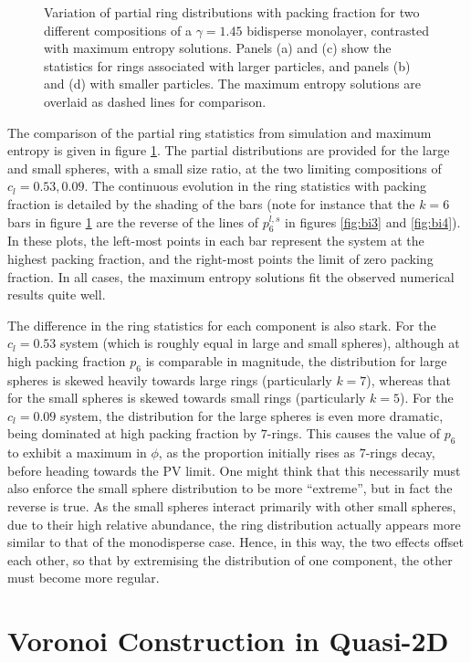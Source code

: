 \begin{figure}[bt]
     \caption{Variation of partial ring distributions with packing fraction for two different compositions of a $\gamma=1.45$ bidisperse monolayer, contrasted with maximum entropy solutions. Panels (a) and (c) show the statistics for rings associated with larger particles, and panels (b) and (d) with smaller particles. The maximum entropy solutions are overlaid as dashed lines for comparison.}
     \label{fig:bime}
\end{figure}

The comparison of the partial ring statistics from simulation and maximum entropy is given in figure \ref{fig:bime}.
The partial distributions are provided for the large and small spheres, with a small size ratio, at the two limiting compositions of $c_l=0.53,0.09$.
The continuous evolution in the ring statistics with packing fraction is detailed by the shading of the bars (note for instance that the $k=6$ bars in figure \ref{fig:bime} are the reverse of the lines of $p_6^{l,s}$ in figures \ref{fig:bi3} and \ref{fig:bi4}).
In these plots, the left\--most points in each bar represent the system at the highest packing fraction, and the right\--most points the limit of zero packing fraction.
In all cases, the maximum entropy solutions fit the observed numerical results quite well.

The difference in the ring statistics for each component is also stark.
For the $c_l=0.53$ system (which is roughly equal in large and small spheres), although at high packing fraction $p_6$ is comparable in magnitude, the distribution for large spheres is skewed heavily towards large rings (particularly $k=7$), whereas that for the small spheres is skewed towards small rings (particularly $k=5$).
For the $c_l=0.09$ system, the distribution for the large spheres is even more dramatic, being dominated at high packing fraction by $7$\--rings.
This causes the value of $p_6$ to exhibit a maximum in $\phi$, as the proportion initially rises as $7$\--rings decay, before heading towards the PV limit.
One might think that this necessarily must also enforce the small sphere distribution to be more ``extreme'', but in fact the reverse is true.
As the small spheres interact primarily with other small spheres, due to their high relative abundance, the ring distribution actually appears more similar to that of the monodisperse case.
Hence, in this way, the two effects offset each other, so that by extremising the distribution of one component, the other must become more regular.


\section{Voronoi Construction in Quasi\--2D}

